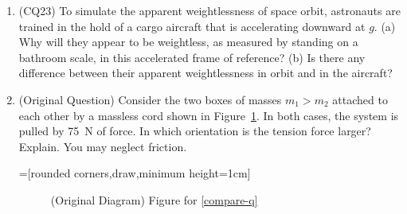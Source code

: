 \documentclass[10pt]{exam}
\def\myquestion{\item\stepcounter{endnote}}
\begin{document}
\begin{enumerate}[resume]
  \myquestion (CQ23)  To simulate the apparent weightlessness of space orbit, astronauts are trained in the hold of a cargo aircraft that is accelerating downward at $g$. (a) Why will they appear to be weightless, as measured by standing on a bathroom scale, in this accelerated frame of reference? (b) Is there any difference between their apparent weightlessness in orbit and in the aircraft? \vs

    \myquestion (Original Question) \label{compare-q} Consider the two boxes of masses $m_1 > m_2$ attached to each other by a massless cord shown in Figure~\ref{compare-fig}.  In both cases, the system is pulled by 75~N of force.  In which orientation is the tension force larger?  Explain.  You may neglect friction.
    
    =[rounded corners,draw,minimum height=1cm]
    \begin{figure}[h]
      \centering
      \caption{(Original Diagram) Figure for \ref{compare-q}}
      \label{compare-fig}
    \end{figure}

    \vs

  \end{enumerate}
\end{document}
